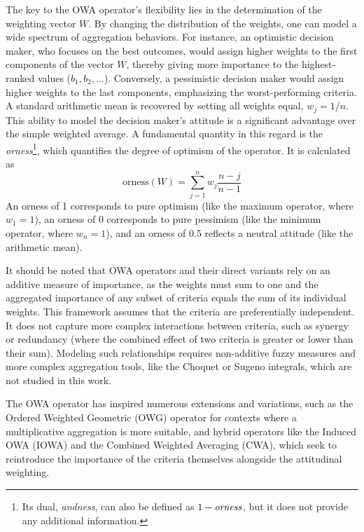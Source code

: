 The key to the OWA operator's flexibility lies in the determination of the weighting vector $W$. By changing the distribution of the weights, one can model a wide spectrum of aggregation behaviors. For instance, an optimistic decision maker, who focuses on the best outcomes, would assign higher weights to the first components of the vector $W$, thereby giving more importance to the highest-ranked values ($b_1, b_2, \dots$). Conversely, a pessimistic decision maker would assign higher weights to the last components, emphasizing the worst-performing criteria. A standard arithmetic mean is recovered by setting all weights equal, $w_j = 1/n$. This ability to model the decision maker's attitude is a significant advantage over the simple weighted average. A fundamental quantity in this regard is the \textit{orness}\footnote{Its dual, \textit{andness}, can also be defined as $1-\text{\textit{orness}}$, but it does not provide any additional information.}, which quantifies the degree of optimism of the operator. It is calculated as \[\text{orness}(W) = \sum_{j=1}^{n} w_j \frac{n-j}{n-1}\] 
An orness of 1 corresponds to pure optimism (like the maximum operator, where $w_1=1$), an orness of 0 corresponds to pure pessimism (like the minimum operator, where $w_n=1$), and an orness of 0.5 reflects a neutral attitude (like the arithmetic mean).

\begin{remark}
    It should be noted that OWA operators and their direct variants rely on an additive measure of importance, as the weights must sum to one and the aggregated importance of any subset of criteria equals the sum of its individual weights. This framework assumes that the criteria are preferentially independent. It does not capture more complex interactions between criteria, such as synergy or redundancy (where the combined effect of two criteria is greater or lower than their sum). Modeling such relationships requires non-additive fuzzy measures and more complex aggregation tools, like the Choquet or Sugeno integrals, which are not studied in this work.\\
\end{remark}


The OWA operator has inspired numerous extensions and variations, such as the Ordered Weighted Geometric (OWG) operator for contexts where a multiplicative aggregation is more suitable, and hybrid operators like the Induced OWA (IOWA) and the Combined Weighted Averaging (CWA), which seek to reintroduce the importance of the criteria themselves alongside the attitudinal weighting. 



